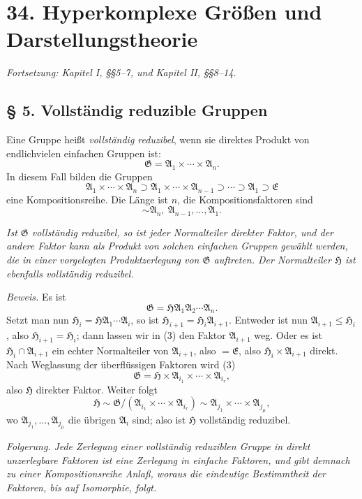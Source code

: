 \documentclass[11pt]{article}
\providecommand{\mG}{\mathfrak{G}}
\providecommand{\mA}{\mathfrak{A}}
\providecommand{\mE}{\mathfrak{E}}
\providecommand{\mH}{\mathfrak{H}}
\begin{document}
\setcounter{footnote}{0}
\section*{34. Hyperkomplexe Größen und Darstellungstheorie}
\emph{Fortsetzung: Kapitel I, §§5--7, und Kapitel II, §§8--14.}

\subsection*{§ 5. Vollständig reduzible Gruppen}

Eine Gruppe heißt \emph{vollständig reduzibel}, wenn sie direktes Produkt von endlichvielen einfachen Gruppen ist:
\[
        \mG=\mA_1\times\cdots\times\mA_n.
\]
In diesem Fall bilden die Gruppen
\[
        \mA_1\times\cdots\times\mA_n
        \supset \mA_1\times\cdots\times\mA_{n-1}
        \supset\cdots\supset \mA_1\supset \mE
\]
eine Kompositionsreihe. Die Länge ist $n$, die Kompositionsfaktoren sind
\[
        \sim \mA_n,\ \mA_{n-1},\ldots,\mA_1.
\]

\emph{Ist $\mG$ vollständig reduzibel, so ist jeder Normalteiler direkter Faktor, und der andere Faktor kann als Produkt von solchen einfachen Gruppen gewählt werden, die in einer vorgelegten Produktzerlegung von $\mG$ auftreten. Der Normalteiler $\mH$ ist ebenfalls vollständig reduzibel.}

\emph{Beweis.} Es ist
\begin{equation}
        \mG=\mH\mA_1\mA_2\cdots\mA_n.             \tag{3}
\end{equation}
Setzt man nun $\mH_i=\mH\mA_1\cdots\mA_i$, so ist $\mH_{i+1}=\mH_i\mA_{i+1}$. Entweder ist nun $\mA_{i+1}\leq \mH_i$, also $\mH_{i+1}=\mH_i$; dann lassen wir in (3) den Faktor $\mA_{i+1}$ weg. Oder es ist $\mH_i\cap\mA_{i+1}$ ein echter Normalteiler von $\mA_{i+1}$, also $=\mE$, also $\mH_i\times\mA_{i+1}$ direkt. Nach Weglassung der überflüssigen Faktoren wird (3)
\[
        \mG=\mH\times\mA_{i_1}\times\cdots\times\mA_{i_r},
\]
also $\mH$ direkter Faktor. Weiter folgt
\[
        \mH\sim \mG/(\mA_{i_1}\times\cdots\times\mA_{i_r})
        \sim \mA_{j_1}\times\cdots\times\mA_{j_\mu},
\]
wo $\mA_{j_1},\ldots,\mA_{j_\mu}$ die übrigen $\mA_i$ sind; also ist $\mH$ vollständig reduzibel.

\emph{Folgerung.} \emph{Jede Zerlegung einer vollständig reduziblen Gruppe in direkt unzerlegbare Faktoren ist eine Zerlegung in einfache Faktoren, und gibt demnach zu einer Kompositionsreihe Anlaß, woraus die eindeutige Bestimmtheit der Faktoren, bis auf Isomorphie, folgt.}
\end{document}
